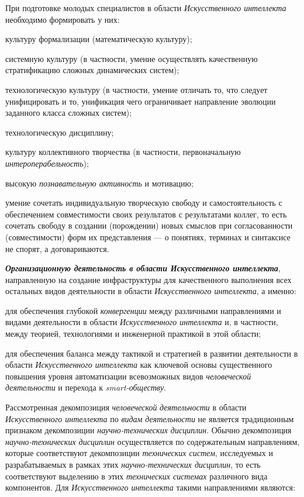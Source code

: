 \begin{textitemize}
	При подготовке молодых специалистов в области \textit{Искусственного интеллекта} необходимо формировать у них:
	\begin{textitemize}
		\item культуру формализации (математическую культуру);
		\item системную культуру (в частности, умение осуществлять качественную стратификацию сложных динамических систем);
		\item технологическую культуру (в частности, умение отличать то, что следует унифицировать и то, унификация чего ограничивает направление эволюции заданного класса сложных систем);
		\item технологическую дисциплину;
		\item культуру коллективного творчества (в частности, первоначальную \textit{интероперабельность});
		\item высокую \textit{познавательную активность} и мотивацию;
		\item умение сочетать индивидуальную творческую свободу и самостоятельность с обеспечением совместимости своих результатов с результатами коллег, то есть сочетать свободу в создании (порождении) новых смыслов при согласованности (совместимости) форм их представления --- о понятиях, терминах и синтаксисе не спорят, а договариваются.
	\end{textitemize}
	
	\item
	\textbf{\textit{Организационную деятельность в области Искусственного интеллекта}}, направленную на создание инфраструктуры для качественного выполнения всех остальных видов деятельности в области \textit{Искусственного интеллекта}, а именно:
	\begin{textitemize}
		\item
		для обеспечения глубокой \textit{конвергенции} между различными направлениями и видами деятельности в области \textit{Искусственного интеллекта} и, в частности, между теорией, технологиями и инженерной практикой в этой области;
		\item
		для обеспечения баланса между тактикой и стратегией в развитии деятельности в области \textit{Искусственного интеллекта} как ключевой основы существенного повышения уровня автоматизации всевозможных видов \textit{человеческой деятельности} и перехода к \textit{smart-обществу}.
	\end{textitemize}
\end{textitemize}

Рассмотренная декомпозиция \textit{человеческой} \textit{деятельности} в области \textit{Искусственного интеллекта} по \textit{видам} \textit{деятельности} не является традиционным признаком декомпозиции \textit{научно-технических дисциплин}. Обычно декомпозиция \textit{научно-технических дисциплин} осуществляется по содержательным направлениям, которые соответствуют декомпозиции \textit{технических систем}, исследуемых и разрабатываемых в рамках этих \textit{научно-технических дисциплин}, то есть соответствуют выделению в этих \textit{технических системах} различного вида компонентов. Для \textit{Искусственного интеллекта} такими направлениями являются:


